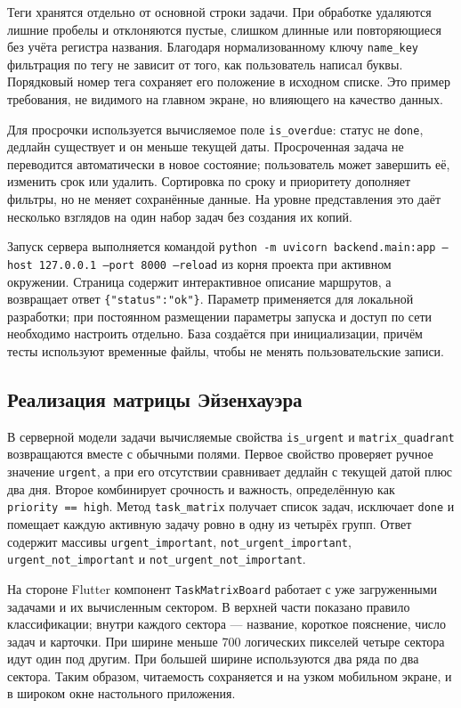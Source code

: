 \documentclass[14pt,a4paper]{extarticle}
\begin{document}
Теги хранятся отдельно от основной строки задачи. При обработке удаляются лишние пробелы и отклоняются пустые, слишком длинные или повторяющиеся без учёта регистра названия. Благодаря нормализованному ключу \texttt{name\_key} фильтрация по тегу не зависит от того, как пользователь написал буквы. Порядковый номер тега сохраняет его положение в исходном списке. Это пример требования, не видимого на главном экране, но влияющего на качество данных.

Для просрочки используется вычисляемое поле \texttt{is\_overdue}: статус не \texttt{done}, дедлайн существует и он меньше текущей даты. Просроченная задача не переводится автоматически в новое состояние; пользователь может завершить её, изменить срок или удалить. Сортировка по сроку и приоритету дополняет фильтры, но не меняет сохранённые данные. На уровне представления это даёт несколько взглядов на один набор задач без создания их копий.

Запуск сервера выполняется командой \texttt{python -m uvicorn backend.main:app --host 127.0.0.1 --port 8000 --reload} из корня проекта при активном окружении. Страница  содержит интерактивное описание маршрутов, а  возвращает ответ \texttt{\{"status":"ok"\}}. Параметр  применяется для локальной разработки; при постоянном размещении параметры запуска и доступ по сети необходимо настроить отдельно. База  создаётся при инициализации, причём тесты используют временные файлы, чтобы не менять пользовательские записи.

\subsection{Реализация матрицы Эйзенхауэра}

В серверной модели задачи вычисляемые свойства \texttt{is\_urgent} и \texttt{matrix\_quadrant} возвращаются вместе с обычными полями. Первое свойство проверяет ручное значение \texttt{urgent}, а при его отсутствии сравнивает дедлайн с текущей датой плюс два дня. Второе комбинирует срочность и важность, определённую как \texttt{priority\ ==\ high}. Метод \texttt{task\_matrix} получает список задач, исключает \texttt{done} и помещает каждую активную задачу ровно в одну из четырёх групп. Ответ содержит массивы \texttt{urgent\_important}, \texttt{not\_urgent\_important}, \texttt{urgent\_not\_important} и \texttt{not\_urgent\_not\_important}.

На стороне Flutter компонент \texttt{TaskMatrixBoard} работает с уже загруженными задачами и их вычисленным сектором. В верхней части показано правило классификации; внутри каждого сектора --- название, короткое пояснение, число задач и карточки. При ширине меньше 700 логических пикселей четыре сектора идут один под другим. При большей ширине используются два ряда по два сектора. Таким образом, читаемость сохраняется и на узком мобильном экране, и в широком окне настольного приложения.
\end{document}
